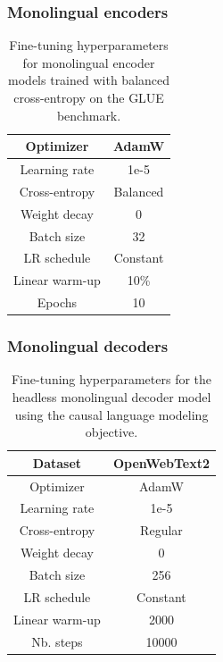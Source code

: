 \subsubsection{Monolingual encoders}
\label{app:ft_mono_enc}
\begin{table}[H]
\centering \small
\begin{tabular}{c|c}
\toprule
Optimizer        &   AdamW         \\ \hline
Learning rate        &   1e-5         \\ \hline
Cross-entropy  &  Balanced  \\ \hline
Weight decay  &     0      \\ \hline
Batch size & 32 \\ \hline
LR schedule & Constant \\ \hline
Linear warm-up & 10\% \\ \hline
Epochs & 10 \\ \bottomrule
\end{tabular}
\caption{Fine-tuning hyperparameters for monolingual encoder models trained with balanced cross-entropy on the GLUE benchmark.}
\label{tab:ft_mono_enc}
\end{table}

\subsubsection{Monolingual decoders}
\label{app:ft_mono_dec}
\begin{table}[H]
\centering \small
\begin{tabular}{c|c}
\toprule
Dataset        &   OpenWebText2         \\ \hline
Optimizer        &   AdamW         \\ \hline
Learning rate        &   1e-5         \\ \hline
Cross-entropy  &  Regular    \\ \hline
Weight decay  &     0      \\ \hline
Batch size & 256 \\ \hline
LR schedule & Constant \\ \hline
Linear warm-up & 2000 \\ \hline
Nb. steps & 10000 \\ \bottomrule
\end{tabular}
\caption{Fine-tuning hyperparameters for the headless monolingual decoder model using the causal language modeling objective.}
\label{tab:ft_mono_dec}
\end{table}

